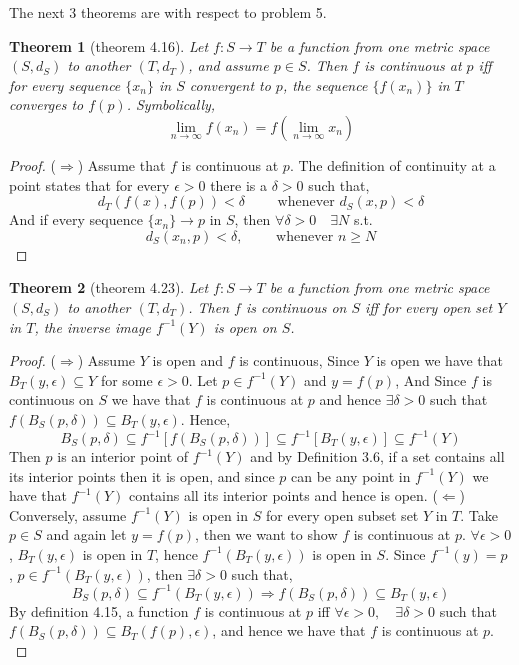\documentclass[aps,pra,notitlepage,amsmath,amssymb,letterpaper,12pt]{revtex4-1}
\newtheorem{theorem}{Theorem}
\begin{document}
The next 3 theorems are with respect to problem 5.
\begin{theorem}[theorem 4.16]
Let $f:S \to T$  be a function from one metric space $(S,d_{S})$ to another $(T,d_{T})$, and assume $p \in S$. Then $f$ is continuous at $p$ iff for every sequence $\{x_{n}\}$ in $S$ convergent to $p$, the sequence $\{f(x_{n})\}$ in $T$ converges to $f(p)$. Symbolically,
\[\lim_{n \to \infty} f(x_{n}) = f(\lim_{n \to \infty} x_{n})\]
\end{theorem}
\begin{proof}
($\Longrightarrow$) Assume that $f$ is continuous at $p$. The definition of continuity at a point states that for every $\epsilon > 0$ there is a $\delta >0$ such that,
\[d_{T}(f(x),f(p)) < \delta \qquad \textrm{  whenever  } d_{S}(x,p) < \delta\]
And if every sequence $\{x_{n}\} \rightarrow p$ in $S$, then  $\forall \delta > 0 \quad \exists N$ s.t. $$d_{S}(x_{n},p) < \delta, \qquad \textrm{ whenever } n \geq N$$
\end{proof}

\begin{theorem}[theorem 4.23]
Let $f:S \to T$  be a function from one metric space $(S,d_{S})$ to another $(T,d_{T})$. Then $f$ is continuous on $S$ iff for every open set $Y$ in $T$, the inverse image $f^{-1}(Y)$ is open on $S$.
\end{theorem}
\begin{proof}
($\Longrightarrow$) Assume $Y$ is open and $f$ is continuous, Since $Y$ is open we have that $B_{T}(y,\epsilon) \subseteq Y$ for some $\epsilon > 0$. Let $p \in f^{-1}(Y)$ and $y=f(p)$, And Since $f$ is continuous on $S$ we have that $f$ is continuous at $p$ and hence $\exists \delta > 0$ such that  $f(B_{S}(p,\delta)) \subseteq B_{T}(y,\epsilon)$. Hence,
\[B_{S}(p,\delta) \subseteq f^{-1}[f(B_{S}(p,\delta))] \subseteq f^{-1}[B_{T}(y,\epsilon)] \subseteq f^{-1}(Y)\]
Then $p$ is an interior point of $f^{-1}(Y)$ and by Definition 3.6, if a set contains all its interior points then it is open, and since $p$ can be any point in $f^{-1}(Y)$ we have that $f^{-1}(Y)$ contains all its interior points and hence is open.
\newline{}
($\Longleftarrow$) Conversely, assume $f^{-1}(Y)$ is open in $S$ for every open subset set $Y$ in $T$. Take $p \in S$ and again let $y=f(p)$, then we want to show $f$ is continuous at $p$. $\forall \epsilon > 0$, $B_{T}(y,\epsilon)$ is open in $T$, hence $f^{-1}(B_{T}(y,\epsilon))$ is open in $S$. Since $f^{-1}(y) = p$ ,  $p \in f^{-1}(B_{T}(y,\epsilon))$, then $\exists \delta > 0$ such that,
\[B_{S}(p,\delta) \subseteq f^{-1}(B_{T}(y,\epsilon)) \Rightarrow f(B_{S}(p,\delta)) \subseteq B_{T}(y,\epsilon)\]
By definition 4.15, a function $f$ is continuous at $p$ iff $\forall \epsilon > 0, \quad \exists \delta > 0$ such that $ f(B_{S}(p,\delta)) \subseteq B_{T}(f(p),\epsilon)$, and hence we have that $f$ is continuous at $p$.
$$ $$
\end{proof}
\end{document}
